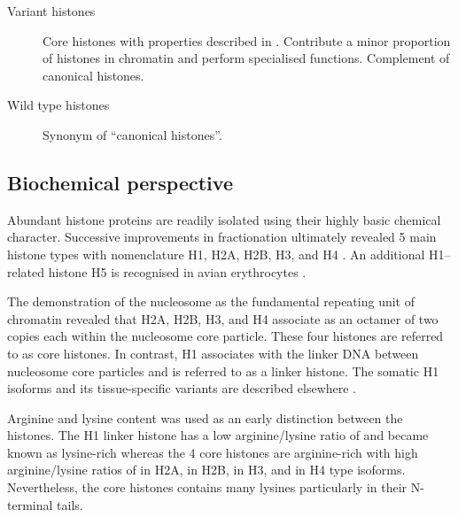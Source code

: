 {\begin{shaded}
\begin{description}
        \item[Variant histones] \hfill \newline
        Core histones with properties described in .
        Contribute a minor proportion of histones in chromatin and perform specialised functions.
        Complement of canonical histones.

        \item[Wild type histones] \hfill \newline
        Synonym of ``canonical histones''.
      \end{description}
    \end{shaded}
  }

  \subsection{Biochemical perspective}

    Abundant histone proteins are readily isolated using their
    highly basic chemical character.
    Successive improvements in fractionation ultimately revealed 5 main histone types
    with nomenclature H1, H2A, H2B, H3, and H4 \citep{nomenclature}.
    An additional H1--related histone H5 is recognised in avian erythrocytes \citep{HFive-review}.

    The demonstration of the nucleosome as the fundamental
    repeating unit of chromatin \citep{Kornberg1974}
    revealed that H2A, H2B, H3, and H4 associate as an octamer of two copies each within the
    nucleosome core particle. These four histones are referred to as core histones.
    In contrast, H1 associates with the linker DNA between nucleosome core particles
    and is referred to as a linker histone.
    The somatic H1 isoforms and its tissue-specific
    variants are described elsewhere \citep{HarshmanFreitas2013}.

    Arginine and lysine content was used as an early distinction between the histones.
    The H1 linker histone has a low arginine/lysine ratio of
     \result{}
    and became known as lysine-rich
    whereas the 4 core histones are arginine-rich
    with high arginine/lysine ratios of
     \result{} in H2A,
     \result{} in H2B,
     \result{} in H3,
    and  \result{} in H4 type isoforms.
    Nevertheless, the core histones contains many lysines particularly in their N-terminal tails.

